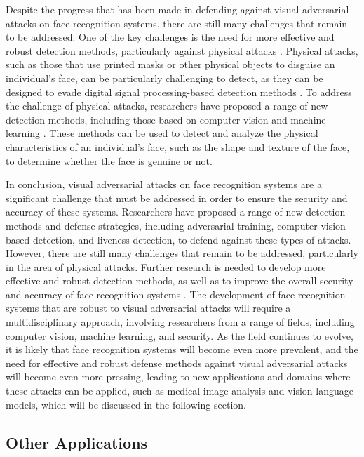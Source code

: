 \documentclass[11pt]{article}
\begin{document}
Despite the progress that has been made in defending against visual adversarial attacks on face recognition systems, there are still many challenges that remain to be addressed. One of the key challenges is the need for more effective and robust detection methods, particularly against physical attacks \cite{ref207}. Physical attacks, such as those that use printed masks or other physical objects to disguise an individual's face, can be particularly challenging to detect, as they can be designed to evade digital signal processing-based detection methods \cite{ref208}. To address the challenge of physical attacks, researchers have proposed a range of new detection methods, including those based on computer vision and machine learning \cite{ref209}. These methods can be used to detect and analyze the physical characteristics of an individual's face, such as the shape and texture of the face, to determine whether the face is genuine or not.

In conclusion, visual adversarial attacks on face recognition systems are a significant challenge that must be addressed in order to ensure the security and accuracy of these systems. Researchers have proposed a range of new detection methods and defense strategies, including adversarial training, computer vision-based detection, and liveness detection, to defend against these types of attacks. However, there are still many challenges that remain to be addressed, particularly in the area of physical attacks. Further research is needed to develop more effective and robust detection methods, as well as to improve the overall security and accuracy of face recognition systems \cite{ref210}. The development of face recognition systems that are robust to visual adversarial attacks will require a multidisciplinary approach, involving researchers from a range of fields, including computer vision, machine learning, and security. As the field continues to evolve, it is likely that face recognition systems will become even more prevalent, and the need for effective and robust defense methods against visual adversarial attacks will become even more pressing, leading to new applications and domains where these attacks can be applied, such as medical image analysis and vision-language models, which will be discussed in the following section.

\subsection{Other Applications}
\end{document}
